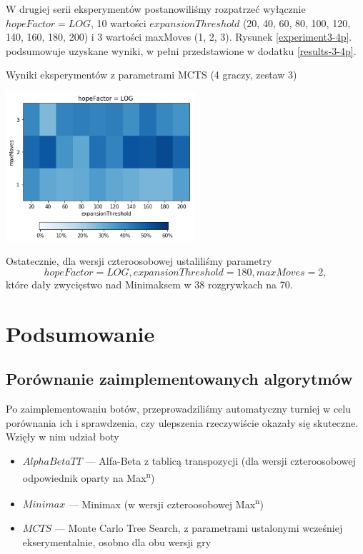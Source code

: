 \documentclass{pracamgr}
\begin{document}
W drugiej serii eksperymentów postanowiliśmy rozpatrzeć wyłącznie \(hopeFactor = LOG\), 10 wartości \(expansionThreshold\) (20, 40, 60, 80, 100, 120, 140, 160, 180, 200) i 3 wartości maxMoves (1, 2, 3).
Rysunek \ref{experiment3-4p}. podsumowuje uzyskane wyniki, w pełni przedstawione w dodatku \ref{results-3-4p}.

\begin{rysunek}
\caption{Wyniki eksperymentów z parametrami MCTS (4 graczy, zestaw 3) \label{experiment3-4p}}
\centering
\includegraphics[width=70mm]{experiment3-4p.png}
\end{rysunek}

Ostatecznie, dla wersji czteroosobowej ustaliliśmy parametry \[hopeFactor = LOG, expansionThreshold = 180, maxMoves=2,\] które dały zwycięstwo nad Minimaksem w 38 rozgrywkach na 70.

\chapter{Podsumowanie}

\section{Porównanie zaimplementowanych algorytmów}

Po zaimplementowaniu botów, przeprowadziliśmy automatyczny turniej w celu porównania ich i sprawdzenia, czy ulepszenia rzeczywiście okazały się skuteczne.
Wzięły w nim udział boty

\begin{itemize}
    \item \(AlphaBetaTT\) --- Alfa-Beta z tablicą transpozycji (dla wersji czteroosobowej odpowiednik oparty na Max\textsuperscript{n})
    \item \(Minimax\) --- Minimax (w wersji czteroosobowej Max\textsuperscript{n})
    \item \(MCTS\) --- Monte Carlo Tree Search, z parametrami ustalonymi wcześniej ekserymentalnie, osobno dla obu wersji gry
\end{itemize}
\end{document}
